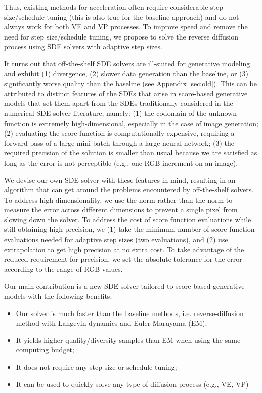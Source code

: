 \documentclass{article}
\begin{document}
Thus, existing methods for acceleration often require considerable step size/schedule tuning (this is also true for the baseline approach) and do not always work for both VE and VP processes. To improve speed and remove the need for step size/schedule tuning, we propose to solve the reverse diffusion process using SDE solvers with adaptive step sizes. 

It turns out that off-the-shelf SDE solvers are ill-suited for generative modeling and exhibit (1) divergence, (2) slower data generation than the baseline, or (3) significantly worse quality than the baseline (see Appendix \ref{sec:old}). This can be attributed to distinct features of the SDEs that arise in score-based generative models that set them apart from the SDEs traditionally considered in the numerical SDE solver literature, namely: (1) the codomain of the unknown function is extremely high-dimensional, especially in the case of image generation;
(2) evaluating the score function is computationally expensive, requiring a forward pass of a large mini-batch through a large neural network; (3) the required precision of the solution is smaller than usual because we are satisfied as long as the error is not perceptible (e.g., one RGB increment on an image).

We devise our own SDE solver with these features in mind, resulting in an algorithm that can get around the problems encountered by off-the-shelf solvers. To address high dimensionality, we use the  norm rather than the  norm to measure the error across different dimensions to prevent a single pixel from slowing down the solver. To address the cost of score function evaluations while still obtaining high precision, we (1) take the minimum number of score function evaluations needed for adaptive step sizes (two evaluations), and (2) use extrapolation to get high precision at no extra cost.
To take advantage of the reduced requirement for precision, we set the absolute tolerance for the error according to the range of RGB values. 



Our main contribution is a new SDE solver tailored to score-based generative models with the following benefits:
\begin{itemize}
 \item Our solver is much faster than the baseline methods, i.e. reverse-diffusion method with Langevin dynamics and Euler-Maruyama (EM);
 \item It yields higher quality/diversity samples than EM when using the same computing budget;
 \item It does not require any step size or schedule tuning;
 \item It can be used to quickly solve any type of diffusion process (e.g., VE, VP)
\end{itemize}
\end{document}
